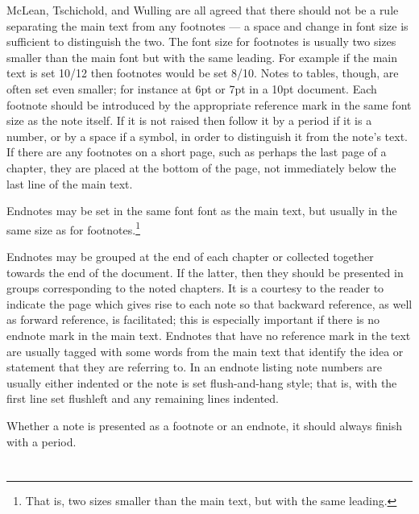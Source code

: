 \documentclass[10pt,letterpaper,extrafontsizes]{memoir}
\begin{document}
    McLean, Tschichold, and Wulling are all agreed that there should not be
a rule separating the main text from any footnotes --- a space and change in
font size is sufficient to distinguish the two. The font size for 
footnotes
is usually two sizes smaller than the main font but with the same 
leading. For example if the main text is set 10/12 then 
footnotes would be set 8/10. Notes to tables, though, are often set even 
smaller; for instance at 6pt or 7pt in a 10pt document. 
Each footnote should be introduced by the 
appropriate reference mark in the same font size as the note itself. If it is 
not raised then follow it by a period if it is a number, or by a space 
if a symbol, in order to distinguish it from the note's text. 
If there are any footnotes on a
short page, such as perhaps the last page of a chapter, they are placed
at the bottom of the page, not immediately below the last line of the main 
text.

   Endnotes may be set in the same font font as the main text, but usually in
the same size as for footnotes.\footnote{That is, two
sizes smaller than the main text, but with the same leading.} 

   Endnotes may be grouped at the end of each chapter or collected together
towards the end of the document. If the latter, then they should be presented
in groups corresponding to the noted chapters. It is a courtesy to the reader
to indicate the page which gives rise to each note so that backward reference,
as well as forward reference, is facilitated; this is especially important
if there is no endnote mark in the main text. Endnotes
that have no reference mark in the text are usually
tagged with some words from the main text that identify the idea or statement
that they are referring to.
   In an endnote listing note numbers are usually either indented or the note
is set flush-and-hang style; that is, with the 
first line set flushleft and any remaining lines indented.

Whether a note
is presented as a footnote or an endnote, it should always finish with a
period.


\renewcommand*{\thefootnote}{\arabic{footnote}}

\section{\prBackmatter}
\end{document}
